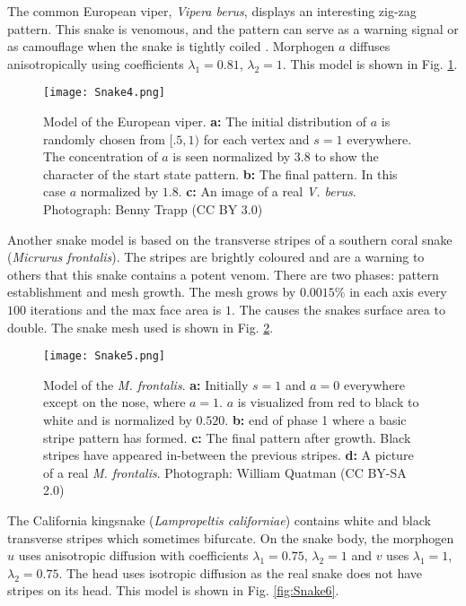 \newpage
The common European viper, \textit{Vipera berus}, displays an interesting zig-zag pattern. This snake is venomous, and the pattern can serve as a warning signal or as camouflage when the snake is tightly coiled \citep{lillywhite2014}. Morphogen $a$ diffuses anisotropically using coefficients $\lambda_{1}=0.81$, $\lambda_{2}=1$. This model is shown in Fig. \ref{fig:Snake4}.

\begin{figure}[ht]
	\centering
	\texttt{[image: Snake4.png]}
	\caption{Model of the European viper. \textbf{a:} The initial distribution of $a$ is randomly chosen from $[.5, 1)$ for each vertex and $s=1$ everywhere. The concentration of $a$ is seen normalized by 3.8 to show the character of the start state pattern. \textbf{b:} The final pattern. In this case $a$ normalized by $1.8$. \textbf{c:} An image of a real \textit{V. berus}. \textcolor{citation-gray}{Photograph: Benny Trapp (CC BY 3.0)}}
	\label{fig:Snake4}
\end{figure}

\newpage
Another snake model is based on the transverse stripes of a southern coral snake (\textit{Micrurus frontalis}). The stripes are brightly coloured and are a warning to others that this snake contains a potent venom. There are two phases: pattern establishment and mesh growth. The mesh grows by $0.0015\%$ in each axis every $100$ iterations and the max face area is $1$. The causes the snakes surface area to double. The snake mesh used is shown in Fig. \ref{fig:Snake5}.

\begin{figure}[ht]
	\centering
	\texttt{[image: Snake5.png]}
	\caption{Model of the \textit{M. frontalis}. \textbf{a:} Initially $s=1$ and $a=0$ everywhere except on the nose, where $a=1$. $a$ is visualized from red to black to white and is normalized by $0.520$. \textbf{b:} end of phase 1 where a basic stripe pattern has formed. \textbf{c:} The final pattern after growth. Black stripes have appeared in-between the previous stripes. \textbf{d:} A picture of a real \textit{M. frontalis}. \textcolor{citation-gray}{Photograph: William Quatman (CC BY-SA 2.0)}}
	\label{fig:Snake5}
\end{figure}

\newpage 

The California kingsnake (\textit{Lampropeltis californiae}) contains white and black transverse stripes which sometimes bifurcate. On the snake body, the morphogen $u$ uses  anisotropic diffusion with coefficients $\lambda_{1}=0.75$, $\lambda_{2}=1$ and $v$ uses $\lambda_{1}=1$, $\lambda_{2}=0.75$. The head uses isotropic diffusion as the real snake does not have stripes on its head. This model is shown in Fig. \ref{fig:Snake6}.

